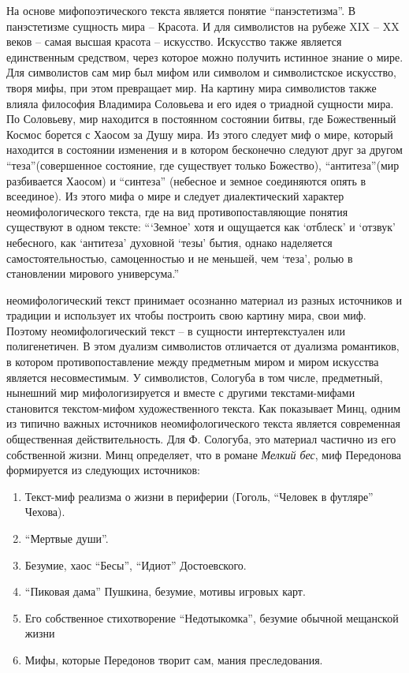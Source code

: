 \documentclass[12pt,a4paper]{article}
\begin{document}
На основе мифопоэтического текста является понятие \enquote{панэстетизма}. В панэстетизме сущность мира -- Красота. И для символистов на рубеже XIX -- XX веков -- самая высшая красота -- искусство. Искусство также является единственным средством, через которое можно получить истинное знание о мире. Для символистов сам мир был мифом или символом и символистское искусство, творя мифы, при этом превращает мир. На картину мира символистов также влияла философия Владимира Соловьева и его идея о триадной сущности мира. По Соловьеву, мир находится в постоянном состоянии битвы, где Божественный Космос борется с Хаосом за Душу мира. Из этого следует миф о мире, который находится в состоянии изменения и в котором бесконечно следуют друг за другом \enquote{теза}(совершенное состояние, где существует только Божество), \enquote{антитеза}(мир разбивается Хаосом) и  \enquote{синтеза} (небесное и земное соединяются опять в всеединое). Из этого мифа о мире и следует диалектический характер неомифологического текста, где на вид противопоставляющие понятия существуют в одном тексте: \enquote{\enquote{Земное} хотя и ощущается как \enquote{отблеск} и \enquote{отзвук} небесного, как \enquote{антитеза} духовной \enquote{тезы} бытия, однако наделяется самостоятельностью, самоценностью и не меньшей, чем \enquote{теза}, ролью в становлении мирового универсума.} \Parencite[71.]{mints2004}


неомифологический текст принимает осознанно материал из разных источников и традиции и использует их чтобы построить свою картину мира, свои миф. Поэтому неомифологический текст -- в сущности интертекстуален или полигенетичен. В этом дуализм символистов отличается от дуализма романтиков, в котором противопоставление между предметным миром и миром искусства является несовместимым. У символистов, Сологуба в том числе, предметный, нынешний мир мифологизируется и вместе с другими текстами-мифами становится текстом-мифом художественного текста. Как показывает Минц, одним из типично важных источников неомифологического текста является современная общественная действительность. Для Ф. Сологуба, это материал частично из его собственной жизни. Минц определяет, что в романе \emph{Мелкий бес}, миф Передонова формируется из следующих источников:

\begin{enumerate}[itemsep=0mm, label=\asbuk*)]
\item Текст-миф реализма о жизни в периферии (Гоголь, \enquote{Человек в футляре} Чехова).
\item \enquote{Мертвые души}.
\item Безумие, хаос \enquote{Бесы}, \enquote{Идиот} Достоевского.
\item \enquote{Пиковая дама} Пушкина, безумие, мотивы игровых карт.
\item Его собственное стихотворение \enquote{Недотыкомка}, безумие обычной мещанской жизни
\item Мифы, которые Передонов творит сам, мания преследования.
\end{enumerate}
\end{document}

